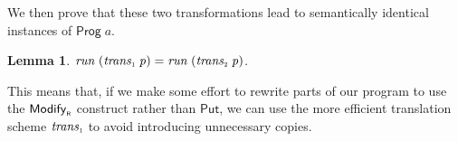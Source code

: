 \documentclass{jfp}
\newcommand{\Conid}[1]{\mathit{#1}}
\newcommand{\Varid}[1]{\mathit{#1}}
\let\Varid\mathit
\let\Conid\mathsf
\newtheorem{lemma}{Lemma}
\begin{document}
We then prove that these two transformations lead to semantically identical
instances of \ensuremath{\Conid{Prog}\;\Varid{a}}.
\begin{lemma}
  \ensuremath{\Varid{run}\;(\Varid{trans}_{\scaleobj{0.7}{1}}\;\Varid{p})\mathrel{=}\Varid{run}\;(\Varid{trans}_{\scaleobj{0.7}{2}}\;\Varid{p})}. \checkmark
\end{lemma}
This means that, if we make some effort to rewrite parts of our program to use
the \ensuremath{\Conid{Modify}_{\scaleobj{0.7}{\sf R}}} construct rather than \ensuremath{\Conid{Put}}, we can use the more efficient
translation scheme \ensuremath{\Varid{trans}_{\scaleobj{0.7}{1}}} to avoid introducing unnecessary copies.

\end{document}
